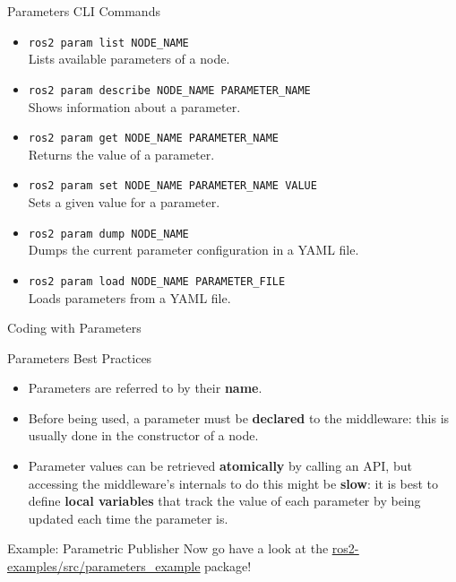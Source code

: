 \begin{frame}{Parameters CLI Commands}
\begin{itemize}
  \item \texttt{ros2 param list NODE\_NAME}\\Lists available parameters of a node.
  \item \texttt{ros2 param describe NODE\_NAME PARAMETER\_NAME}\\Shows information about a parameter.
  \item \texttt{ros2 param get NODE\_NAME PARAMETER\_NAME}\\Returns the value of a parameter.
  \item \texttt{ros2 param set NODE\_NAME PARAMETER\_NAME VALUE}\\Sets a given value for a parameter.
  \item \texttt{ros2 param dump NODE\_NAME}\\Dumps the current parameter configuration in a YAML file.
  \item \texttt{ros2 param load NODE\_NAME PARAMETER\_FILE}\\Loads parameters from a YAML file.
\end{itemize}
\end{frame}

\begin{frame}{Coding with Parameters}
\begin{block}{Parameters Best Practices}
  \begin{itemize}
    \item Parameters are referred to by their \textbf{name}.
    \item Before being used, a parameter must be \textbf{declared} to the middleware: this is usually done in the constructor of a node.
    \item Parameter values can be retrieved \textbf{atomically} by calling an API, but accessing the middleware's internals to do this might be \textbf{slow}: it is best to define \textbf{local variables} that track the value of each parameter by being updated each time the parameter is.
  \end{itemize}
\end{block}
\end{frame}

\begin{frame}{Example: Parametric Publisher}
  Now go have a look at the \href{https://github.com/IntelligentSystemsLabUTV/ros2-examples/tree/galactic/src/parameters_example}{\color{blue}\underline{ros2-examples/src/parameters\_example}} package!
\end{frame}
